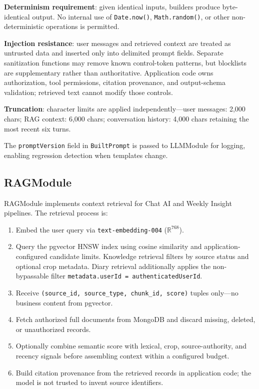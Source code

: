 \documentclass[conference]{IEEEtran}
\begin{document}
\textbf{Determinism requirement}: given identical inputs, builders produce byte-identical output. No internal use of \texttt{Date.now()}, \texttt{Math.random()}, or other non-deterministic operations is permitted.

\textbf{Injection resistance}: user messages and retrieved context are treated as untrusted data and inserted only into delimited prompt fields. Separate sanitization functions may remove known control-token patterns, but blocklists are supplementary rather than authoritative. Application code owns authorization, tool permissions, citation provenance, and output-schema validation; retrieved text cannot modify those controls.

\textbf{Truncation}: character limits are applied independently---user messages: 2,000 chars; RAG context: 6,000 chars; conversation history: 4,000 chars retaining the most recent six turns.

The \texttt{promptVersion} field in \texttt{BuiltPrompt} is passed to LLMModule for logging, enabling regression detection when templates change.

\subsection{RAGModule}

RAGModule implements context retrieval for Chat AI and Weekly Insight pipelines. The retrieval process is:

\begin{enumerate}
    \item Embed the user query via \texttt{text-embedding-004} ($\mathbb{R}^{768}$).
    \item Query the pgvector HNSW index using cosine similarity and application-configured candidate limits. Knowledge retrieval filters by source status and optional crop metadata. Diary retrieval additionally applies the non-bypassable filter \texttt{metadata.userId = authenticatedUserId}.
    \item Receive \texttt{(source\_id, source\_type, chunk\_id, score)} tuples only---no business content from pgvector.
    \item Fetch authorized full documents from MongoDB and discard missing, deleted, or unauthorized records.
    \item Optionally combine semantic score with lexical, crop, source-authority, and recency signals before assembling context within a configured budget.
    \item Build citation provenance from the retrieved records in application code; the model is not trusted to invent source identifiers.
\end{enumerate}
\end{document}
